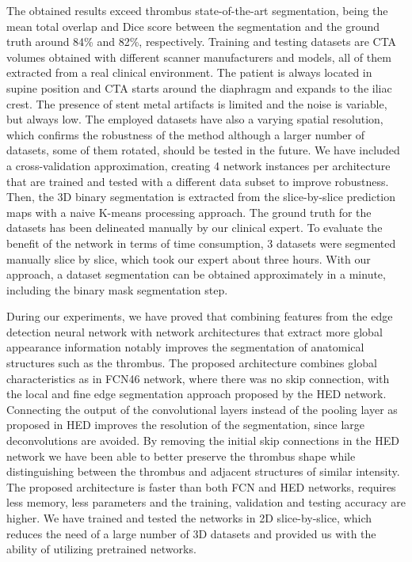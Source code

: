 \documentclass[preprint,authoryear,12pt]{elsarticle}
\begin{document}
The obtained results exceed thrombus state-of-the-art segmentation, being the mean total overlap and Dice score between the segmentation and the ground truth around 84\% and 82\%, respectively. Training and testing datasets are CTA volumes obtained with different scanner manufacturers and models, all of them extracted from a real clinical environment. The patient is always located in supine position and CTA starts around the diaphragm and expands to the iliac crest. The presence of stent metal artifacts is limited and the noise is variable, but always low. The employed datasets have also a varying spatial resolution, which confirms the robustness of the method although a larger number of datasets, some of them rotated, should be tested in the future.
We have included a cross-validation approximation, creating 4 network instances per architecture that are trained and tested with a different data subset to improve robustness. Then, the 3D binary segmentation is extracted from the slice-by-slice prediction maps with a naive K-means processing approach. The ground truth for the datasets has been delineated manually by our clinical expert. To evaluate the benefit of the network in terms of time consumption, 3 datasets were segmented manually slice by slice, which took our expert about three hours. With our approach, a dataset segmentation can be obtained approximately in a minute, including the binary mask segmentation step. %
\par

During our experiments, we have proved that combining features from the edge detection neural network with network architectures that extract more global appearance information notably improves the segmentation of anatomical structures such as the thrombus. The proposed architecture combines global characteristics as in FCN46 network, where there was no skip connection, with the local and fine edge segmentation approach proposed by the HED network. Connecting the output of the convolutional layers instead of the pooling layer as proposed in HED improves the resolution of the segmentation, since large deconvolutions are avoided. By removing the initial skip connections in the HED network we have been able to better preserve the thrombus shape while distinguishing between the thrombus and adjacent structures of similar intensity. The proposed architecture is faster than both FCN and HED networks, requires less memory, less parameters and the training, validation and testing accuracy are higher. We have trained and tested the networks in 2D slice-by-slice, which reduces the need of a large number of 3D datasets and provided us with the ability of utilizing pretrained networks. \par
\end{document}
